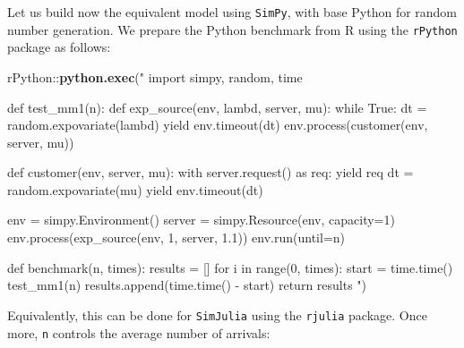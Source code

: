 \documentclass[twoside,nohyper]{tufte-book}
\newenvironment{Shaded}{}{}
\newcommand{\KeywordTok}[1]{\textcolor[rgb]{0.00,0.44,0.13}{\textbf{#1}}}
\newcommand{\NormalTok}[1]{#1}
\newcommand{\OperatorTok}[1]{\textcolor[rgb]{0.40,0.40,0.40}{#1}}
\newcommand{\StringTok}[1]{\textcolor[rgb]{0.25,0.44,0.63}{#1}}
\theoremstyle{definition}
\theoremstyle{definition}
\theoremstyle{definition}
\theoremstyle{remark}
\begin{document}
Let us build now the equivalent model using \texttt{SimPy}, with base
Python for random number generation. We prepare the Python benchmark
from R using the \texttt{rPython}
package\cite[0pt]{CRAN:rPython}
as follows:

\begin{Shaded}
\begin{Highlighting}[]
\NormalTok{rPython}\OperatorTok{::}\KeywordTok{python.exec}\NormalTok{(}\StringTok{"}
\StringTok{import simpy, random, time}

\StringTok{def test_mm1(n):}
\StringTok{  def exp_source(env, lambd, server, mu):}
\StringTok{      while True:}
\StringTok{          dt = random.expovariate(lambd)}
\StringTok{          yield env.timeout(dt)}
\StringTok{          env.process(customer(env, server, mu))}

\StringTok{  def customer(env, server, mu):}
\StringTok{      with server.request() as req:}
\StringTok{          yield req}
\StringTok{          dt = random.expovariate(mu)}
\StringTok{          yield env.timeout(dt)}

\StringTok{  env = simpy.Environment()}
\StringTok{  server = simpy.Resource(env, capacity=1)}
\StringTok{  env.process(exp_source(env, 1, server, 1.1))}
\StringTok{  env.run(until=n)}

\StringTok{def benchmark(n, times):}
\StringTok{  results = []}
\StringTok{  for i in range(0, times):}
\StringTok{    start = time.time()}
\StringTok{    test_mm1(n)}
\StringTok{    results.append(time.time() - start)}
\StringTok{  return results}
\StringTok{"}\NormalTok{)}
\end{Highlighting}
\end{Shaded}

Equivalently, this can be done for \texttt{SimJulia} using the
\texttt{rjulia}
package\cite[0pt]{GitHub:rJulia}.
Once more, \texttt{n} controls the average number of arrivals:
\end{document}
